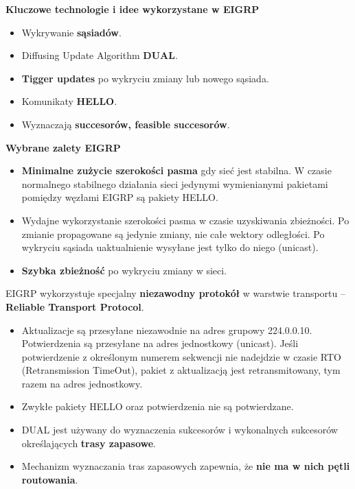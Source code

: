 \documentclass[../main.tex]{subfiles}
\begin{document}
    \textbf{Kluczowe technologie i idee wykorzystane w EIGRP}
    \begin{itemize}
        \item Wykrywanie \textbf{sąsiadów}.
        \item Diffusing Update Algorithm \textbf{DUAL}.
        \item \textbf{Tigger updates} po wykryciu zmiany lub nowego sąsiada.
        \item Komunikaty \textbf{HELLO}.
        \item Wyznaczają \textbf{succesorów, feasible succesorów}.
    \end{itemize}

    \textbf{Wybrane zalety EIGRP}
    \begin{itemize}
        \item \textbf{Minimalne zużycie szerokości pasma} gdy sieć jest stabilna. W czasie normalnego
        stabilnego działania sieci jedynymi wymienianymi pakietami pomiędzy węzłami EIGRP są
        pakiety HELLO.
        \item Wydajne wykorzystanie szerokości pasma w czasie uzyskiwania zbieżności. Po zmianie
        propagowane są jedynie zmiany, nie całe wektory odległości. Po wykryciu sąsiada
        uaktualnienie wysyłane jest tylko do niego (unicast).
        \item \textbf{Szybka zbieżność} po wykryciu zmiany w sieci.
    \end{itemize}


    EIGRP wykorzystuje specjalny \textbf{niezawodny protokół} w warstwie transportu – \textbf{Reliable
    Transport Protocol}.
    \begin{itemize}
        \item Aktualizacje są przesyłane niezawodnie na adres grupowy 224.0.0.10. Potwierdzenia są przesyłane na adres
        jednostkowy (unicast). Jeśli potwierdzenie z określonym numerem sekwencji nie nadejdzie w
        czasie RTO (Retransmission TimeOut), pakiet z aktualizacją jest retransmitowany, tym razem
        na adres jednostkowy.
        \item Zwykłe pakiety HELLO oraz potwierdzenia nie są potwierdzane.
        \item DUAL jest używany do wyznaczenia sukcesorów i wykonalnych
        sukcesorów określających \textbf{trasy zapasowe}.
        \item Mechanizm wyznaczania tras zapasowych zapewnia, że \textbf{nie ma w nich pętli routowania}.
    \end{itemize}
\end{document}
